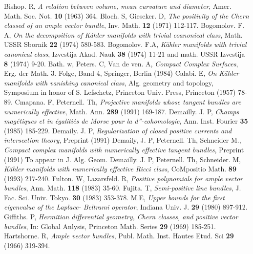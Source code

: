 \begin{thebibliography}{99}
 Bishop. R, \textit{A relation between volume, mean curvature and diameter}, Amer. Math. Soc. Not. {\bf 10} (1963) 364.
 Bloch. S, Gieseker. D, \textit{The positivity of the Chern classed of an ample vector bundle}, Inv. Math. {\bf 12} (1971) 112-117.
 Bogomolov. F. A, \textit{On the decompsition of K\'ahler manifolds with trivial coanonical class}, Math. USSR Sbornik {\bf 22} (1974) 580-583.
 Bogomolov. F.A, \textit{K\"ahler manifolds with trivial canonical class}, Izvestija Akad. Nauk {\bf 38} (1974) 11-21 and math. USSR Izvestija {\bf 8} (1974) 9-20.
 Bath. w, Peters. C, Van de ven. A, \textit{Compact Complex Surfaces}, Erg. der Math. 3. Folge, Band 4, Springer, Berlin (1984)
 Calabi. E, \textit{On K\"ahler manifolds with vanishing canonical class}, Alg. geometry and topology, Symposium in honor of S. Lefschetz, Princeton Univ. Press, Princeton (1957) 78-89.
 Cmapana. F, Peternell. Th, \textit{Projective manifolds whose tangent bundles are numerically effective}, Math. Ann.  {\bf  289} (1991) 169-187.
 Demailly. J. P, \textit{Champs mag\'etiques et in \'egaliti\'es de Morse pour la d''-cohomologie}, Ann. Inst. Fourier {\bf 35} (1985) 185-229.
\bibitem[De91] Demaily. J. P, \textit{Regularization of closed positive currents and intersection theory}, Preprint (1991) 
 Demaily, J. P, Peternell. Th, Schneider M., \textit{Compact complex manifolds with numerically effective tangent bundles}, Preprint (1991) To appear in J. Alg. Geom.
 Demailly. J. P, Peternell. Th, Schneider. M, \textit{K\"ahler manifolds with numerically effective Ricci class}, CoMpositio Math. {\bf 89} (1993) 217-240.
 Fulton. W, Lazarsfeld. R, \textit{Positive polynomials for ample vector bundles}, Ann. Math.
{\bf 118} (1983) 35-60.
 Fujita. T, \textit{Semi-positive line bundles}, J. Fac. Sci. Univ. Tokyo. {\bf 30} (1983) 353-378.
 M.E, \textit{Upper bounds for the first eigenvalue of the Laplace- Beltrami operator}, Indiana Univ. J. {\bf 29} (1980) 897-912.
 Giffiths. P, \textit{Hermitian differential geometry, Chern classes, and positive vector 
bundles}, In: Global Anlysis, Princeton Math. Series {\bf 29} (1969) 185-251.
  Hartshorne. R, \textit{Ample vector bundles}, Publ. Math. Inst. Hautes Etud. Sci {\bf 29} (1966) 319-394.

\end{thebibliography}
